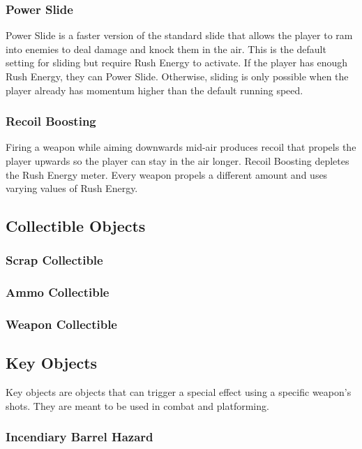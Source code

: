 \documentclass[12pt]{article}
\begin{document}
\subsubsection{Power Slide}

Power Slide is a faster version of the standard slide that allows the player to ram into enemies to deal damage and knock them in the air. This is the default setting for sliding but require Rush Energy to activate. If the player has enough Rush Energy, they can Power Slide. Otherwise, sliding is only possible when the player already has momentum higher than the default running speed. 

\subsubsection{Recoil Boosting}

Firing a weapon while aiming downwards mid-air produces recoil that propels the player upwards so the player can stay in the air longer. Recoil Boosting depletes the Rush Energy meter. Every weapon propels a different amount and uses varying values of Rush Energy. 

\subsection{Collectible Objects}

\subsubsection{Scrap Collectible}

\subsubsection{Ammo Collectible}

\subsubsection{Weapon Collectible}

\subsection{Key Objects}

Key objects are objects that can trigger a special effect using a specific weapon's shots. They are meant to be used in combat and platforming.

\subsubsection{Incendiary Barrel Hazard}
\end{document}
